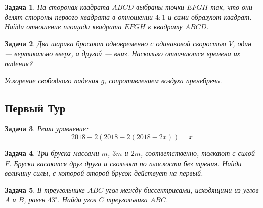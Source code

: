\documentclass[12pt]{article}
\theoremstyle{break}
\newtheorem{problem}{Задача}[subsection]
\begin{document}
\begin{problem}
На сторонах квадрата $ABCD$ выбраны точки $EFGH$ так,
что они делят стороны первого квадрата в отношении $4:1$ и сами образуют квадрат.
Найди отношение площади квадрата $EFGH$ к квадрату $ABCD$.
\end{problem}

\begin{problem}
Два шарика  бросают одновременно с одинаковой скоростью $V$,
один — вертикально вверх, а другой — вниз.
Насколько отличаются времена их падения?

Ускорение свободного падения $g$, сопротивлением воздуха пренебречь.
\end{problem}



\newpage

\subsection{Первый Тур}

\begin{problem}
Реши уравнение:
\[
2018 − 2(2018 − 2(2018 − 2x)) = x
\]
\end{problem}

\begin{problem}
Три бруска массами $m$, $3m$ и $2m$, соответственно, толкают с силой $F$.
Бруски касаются друг друга и скользят по плоскости без трения.
Найди величину силы, с которой второй брусок действует на первый.

\begin{minipage}{0.8\textwidth}
\begin{center}
\end{center}
\end{minipage}
\end{problem}


\begin{problem}
В треугольнике $ABC$ угол между биссектрисами, исходящими из углов $A$ и $B$,
равен $43^{\circ}$. Найди угол $C$ треугольника $ABC$.
\end{problem}
\end{document}
